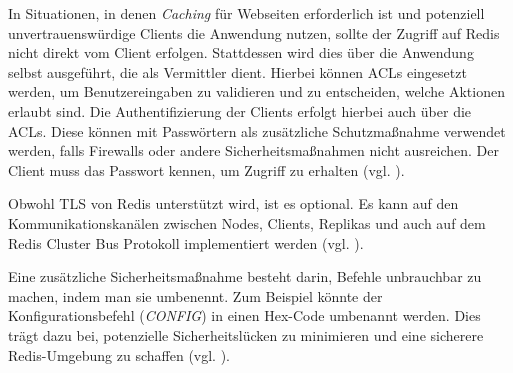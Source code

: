 In Situationen, in denen \textit{Caching} für Webseiten erforderlich ist und potenziell unvertrauenswürdige Clients die Anwendung nutzen, sollte der Zugriff auf Redis nicht direkt vom Client erfolgen. Stattdessen wird dies über die Anwendung selbst ausgeführt, die als Vermittler dient.
Hierbei können \acp{ACL} eingesetzt werden, um Benutzereingaben zu validieren und zu entscheiden, welche Aktionen erlaubt sind. Die Authentifizierung der Clients erfolgt hierbei auch über die \acp{ACL}.
Diese können mit Passwörtern als zusätzliche Schutzmaßnahme verwendet werden, falls Firewalls oder andere Sicherheitsmaßnahmen nicht ausreichen. Der Client muss das Passwort kennen, um Zugriff zu erhalten (vgl. \cite{Redis-Security}).

Obwohl \ac{TLS} von \ac{Redis} unterstützt wird, ist es optional. Es kann auf den Kommunikationskanälen zwischen Nodes, Clients, Replikas und auch auf dem \acs{Redis} Cluster Bus Protokoll implementiert werden (vgl. \cite{Redis-Security}).

Eine zusätzliche Sicherheitsmaßnahme besteht darin, Befehle unbrauchbar zu machen, indem man sie umbenennt. Zum Beispiel könnte der Konfigurationsbefehl (\textit{CONFIG}) in einen Hex-Code umbenannt werden. Dies trägt dazu bei, potenzielle Sicherheitslücken zu minimieren und eine sicherere \acs{Redis}-Umgebung zu schaffen (vgl. \cite{Redis-Security}).
